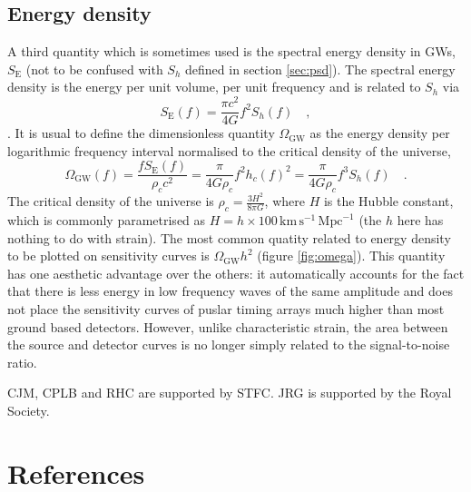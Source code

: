 \documentclass[fleqn,12pt]{iopart}
\begin{document}
\subsection{Energy density}
A third quantity which is sometimes used is the spectral energy density in GWs, $S_{\textrm{E}}$ (not to be confused with $S_{h}$ defined in section \ref{sec:psd}). The spectral energy density is the energy per unit volume, per unit frequency and is related to $S_{h}$ via
\begin{equation}\label{eq:spectralenergydensity} S_{\textrm{E}}(f)=\frac{\pi c^{2}}{4G} f^{2}S_{h}(f) \quad , \end{equation}
\cite{HellingsDowns}. It is usual to define the dimensionless quantity $\Omega_{\textrm{GW}}$ as the energy density per logarithmic frequency interval normalised to the critical density of the universe,
\begin{equation}\label{eq:omega} 
\Omega_{\textrm{GW}}(f)=\frac{fS_{\textrm{E}}(f)}{\rho_{c}c^{2}}=\frac{\pi}{4G\rho_{c}}f^{2}h_{c}(f)^{2}=\frac{\pi}{4G\rho_{c}}f^{3}S_{h}(f)  \quad .
\end{equation}
The critical density of the universe is $\rho_{c}=\frac{3H^{2}}{8\pi G}$, where $H$ is the Hubble constant, which is commonly parametrised as $H=h\times 100\, \textrm{km}\,\textrm{s}^{-1}\,\textrm{Mpc}^{-1}$ (the $h$ here has nothing to do with strain). The most common quatity related to energy density to be plotted on sensitivity curves is $\Omega_{\textrm{GW}}h^{2}$ (figure \ref{fig:omega}). This quantity has one aesthetic advantage over the others: it automatically accounts for the fact that there is less energy in low frequency waves of the same amplitude and does not place the sensitivity curves of puslar timing arrays much higher than most ground based detectors. However, unlike characteristic strain, the area between the source and detector curves is no longer simply related to the signal-to-noise ratio.

\ack
CJM, CPLB and RHC are supported by STFC. JRG is supported by the Royal Society.

\section*{References}
\end{document}
